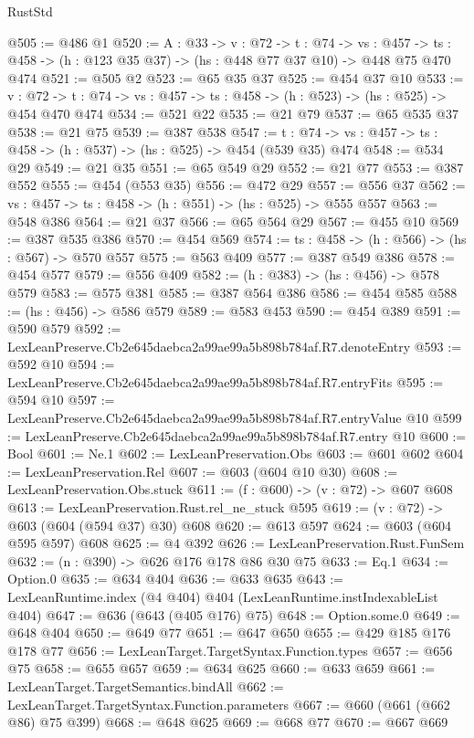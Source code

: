 \begin{lexlean}{RustStd}
\begin{coremodule}
@505 := @486 @1
@520 := {A : @33} ->
  {v : @72} ->
  {t : @74} ->
  {vs : @457} -> {ts : @458} -> (h : @123 @35 @37) -> (hs : @448 @77 @37 @10) -> @448 @75 @470 @474
@521 := @505 @2
@523 := @65 @35 @37
@525 := @454 @37 @10
@533 := {v : @72} ->
  {t : @74} -> {vs : @457} -> {ts : @458} -> (h : @523) -> (hs : @525) -> @454 @470 @474
@534 := @521 @22
@535 := @21 @79
@537 := @65 @535 @37
@538 := @21 @75
@539 := @387 @538
@547 := {t : @74} -> {vs : @457} -> {ts : @458} -> (h : @537) -> (hs : @525) -> @454 (@539 @35) @474
@548 := @534 @29
@549 := @21 @35
@551 := @65 @549 @29
@552 := @21 @77
@553 := @387 @552
@555 := @454 (@553 @35)
@556 := @472 @29
@557 := @556 @37
@562 := {vs : @457} -> {ts : @458} -> (h : @551) -> (hs : @525) -> @555 @557
@563 := @548 @386
@564 := @21 @37
@566 := @65 @564 @29
@567 := @455 @10
@569 := @387 @535 @386
@570 := @454 @569
@574 := {ts : @458} -> (h : @566) -> (hs : @567) -> @570 @557
@575 := @563 @409
@577 := @387 @549 @386
@578 := @454 @577
@579 := @556 @409
@582 := (h : @383) -> (hs : @456) -> @578 @579
@583 := @575 @381
@585 := @387 @564 @386
@586 := @454 @585
@588 := (hs : @456) -> @586 @579
@589 := @583 @453
@590 := @454 @389
@591 := @590 @579
@592 := LexLeanPreserve.Cb2e645daebca2a99ae99a5b898b784af.R7.denoteEntry
@593 := @592 @10
@594 := LexLeanPreserve.Cb2e645daebca2a99ae99a5b898b784af.R7.entryFits
@595 := @594 @10
@597 := LexLeanPreserve.Cb2e645daebca2a99ae99a5b898b784af.R7.entryValue @10
@599 := LexLeanPreserve.Cb2e645daebca2a99ae99a5b898b784af.R7.entry @10
@600 := Bool
@601 := Ne.{1}
@602 := LexLeanPreservation.Obs
@603 := @601 @602
@604 := LexLeanPreservation.Rel
@607 := @603 (@604 @10 @30)
@608 := LexLeanPreservation.Obs.stuck
@611 := (f : @600) -> (v : @72) -> @607 @608
@613 := LexLeanPreservation.Rust.rel_ne_stuck @595
@619 := (v : @72) -> @603 (@604 (@594 @37) @30) @608
@620 := @613 @597
@624 := @603 (@604 @595 @597) @608
@625 := @4 @392
@626 := LexLeanPreservation.Rust.FunSem
@632 := (n : @390) -> @626 @176 @178 @86 @30 @75
@633 := Eq.{1}
@634 := Option.{0}
@635 := @634 @404
@636 := @633 @635
@643 := LexLeanRuntime.index (@4 @404) @404 (LexLeanRuntime.instIndexableList @404)
@647 := @636 (@643 (@405 @176) @75)
@648 := Option.some.{0}
@649 := @648 @404
@650 := @649 @77
@651 := @647 @650
@655 := @429 @185 @176 @178 @77
@656 := LexLeanTarget.TargetSyntax.Function.types
@657 := @656 @75
@658 := @655 @657
@659 := @634 @625
@660 := @633 @659
@661 := LexLeanTarget.TargetSemantics.bindAll
@662 := LexLeanTarget.TargetSyntax.Function.parameters
@667 := @660 (@661 (@662 @86) @75 @399)
@668 := @648 @625
@669 := @668 @77
@670 := @667 @669

\end{coremodule}
\end{lexlean}
